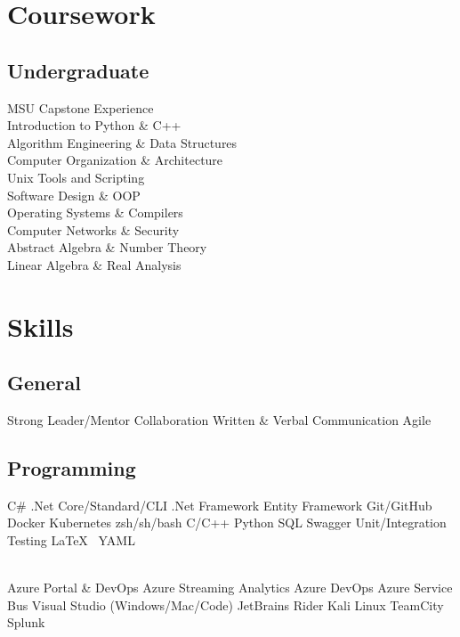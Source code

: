\documentclass[]{deedy-resume-openfont}
\begin{document}
\begin{minipage}[t]{0.33\textwidth}

\section{Coursework}

\subsection{Undergraduate}
MSU Capstone Experience \\
Introduction to Python \& C++ \\
Algorithm Engineering \& Data Structures \\
Computer Organization \& Architecture \\
Unix Tools and Scripting \\
Software Design \& OOP \\
Operating Systems \& Compilers \\
Computer Networks \& Security \\
Abstract Algebra \& Number Theory \\
Linear Algebra \& Real Analysis

\sectionsep


\section{Skills}
\subsection{General} 
Strong Leader/Mentor \textbullet{} Collaboration \textbullet{} Written \& Verbal Communication \textbullet{} Agile

\subsection{Programming} C\# \textbullet{} .Net Core/Standard/CLI \textbullet{} .Net Framework \textbullet{} Entity Framework \textbullet{} Git/GitHub \textbullet{} Docker \textbullet{} Kubernetes \textbullet{} zsh/sh/bash \textbullet{} C/C++ \textbullet{} Python \textbullet{} SQL \textbullet{} Swagger \textbullet{} Unit/Integration Testing \textbullet{} \LaTeX\ \textbullet{} YAML \textbullet{}

\\

Azure Portal & DevOps \textbullet{} Azure Streaming Analytics \textbullet{} Azure DevOps \textbullet{} Azure Service Bus \textbullet{} Visual Studio (Windows/Mac/Code)  \textbullet{} JetBrains Rider \textbullet{} Kali Linux \textbullet{} TeamCity \textbullet{} Splunk \textbullet{}


\sectionsep

%
%

\end{minipage} 
\end{document}
